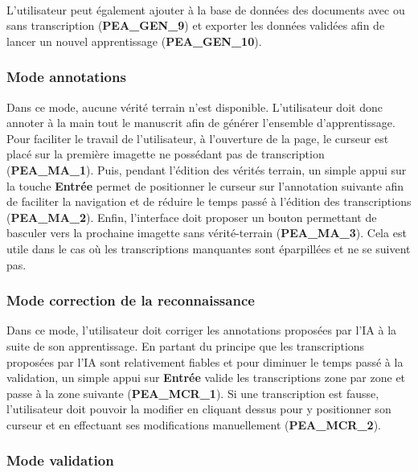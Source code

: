 \paragraph{}
L’utilisateur peut également ajouter à la base de données des documents avec
ou sans transcription (\textbf{PEA\_GEN\_9}) et exporter les données validées
afin de lancer un nouvel apprentissage (\textbf{PEA\_GEN\_10}).

\subsubsection{Mode annotations}

Dans ce mode, aucune vérité terrain n’est disponible. L’utilisateur doit donc
annoter à la main tout le manuscrit afin de générer l’ensemble
d’apprentissage. Pour faciliter le travail de l’utilisateur, à l’ouverture de
la page, le curseur est placé sur la première imagette ne possédant pas de
transcription (\textbf{PEA\_MA\_1}). Puis, pendant l’édition des vérités
terrain, un simple appui sur la touche \textbf{Entrée} permet de positionner le
curseur sur l’annotation suivante afin de faciliter la navigation et de réduire
le temps passé à l’édition des transcriptions (\textbf{PEA\_MA\_2}). Enfin,
l’interface doit proposer un bouton permettant de basculer vers la prochaine
imagette sans vérité-terrain (\textbf{PEA\_MA\_3}). Cela est utile dans le cas
où les transcriptions manquantes sont éparpillées et ne se suivent pas.

\subsubsection{Mode correction de la reconnaissance}

Dans ce mode, l’utilisateur doit corriger les annotations proposées par l’IA
à la suite de son apprentissage. En partant du principe que les transcriptions
proposées par l’IA sont relativement fiables et pour diminuer le temps passé
à la validation, un simple appui sur \textbf{Entrée} valide les transcriptions
zone par zone et passe à la zone suivante (\textbf{PEA\_MCR\_1}). Si une
transcription est fausse, l’utilisateur doit pouvoir la modifier en cliquant
dessus pour y positionner son curseur et en effectuant ses modifications
manuellement (\textbf{PEA\_MCR\_2}).

\subsubsection{Mode validation}

